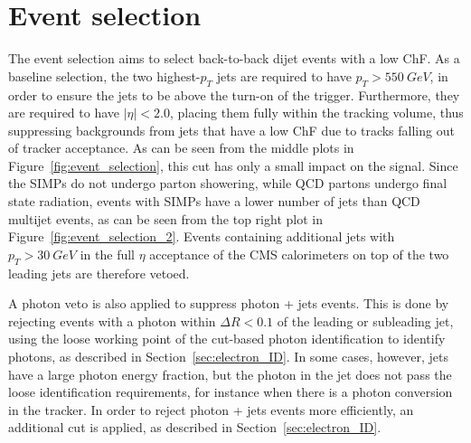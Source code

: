 \section{Event selection}
\label{sec:SIMP_selection}

The event selection aims to select back-to-back dijet events with a low ChF. As a baseline selection, the two highest-$p_T$ jets are required to have $p_T > \SI{550}{GeV}$, in order to ensure the jets to be above the turn-on of the trigger. Furthermore, they are required to have $|\eta| < 2.0$, placing them fully within the tracking volume, thus suppressing backgrounds from jets that have a low ChF due to tracks falling out of tracker acceptance. As can be seen from the middle plots in Figure~\ref{fig:event_selection}, this cut has only a small impact on the signal. Since the \acp{SIMP} do not undergo parton showering, while \ac{QCD} partons undergo final state radiation, events with \acp{SIMP} have a lower number of jets than \ac{QCD} multijet events, as can be seen from the top right plot in Figure~\ref{fig:event_selection_2}. Events containing additional jets with $p_T>\SI{30}{GeV}$ in the full $\eta$ acceptance of the CMS calorimeters on top of the two leading jets are therefore vetoed.

A photon veto is also applied to suppress photon + jets events. This is done by rejecting events with a photon within $\Delta R < 0.1$ of the leading or subleading jet, using the loose working point of the cut-based photon identification to identify photons, as described in Section~\ref{sec:electron_ID}. In some cases, however, jets have a large photon energy fraction, but the photon in the jet does not pass the loose identification requirements, for instance when there is a photon conversion in the tracker. In order to reject photon + jets events more efficiently, an additional cut is applied, as described in Section~\ref{sec:electron_ID}.

